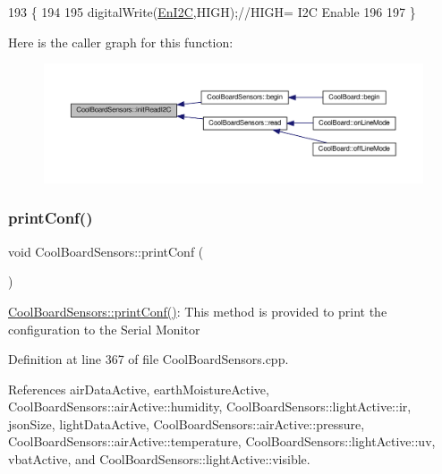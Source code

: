\begin{DoxyCode}
193 \{
194   
195     digitalWrite(\hyperlink{classCoolBoardSensors_aaa6b5dbf3a6633bffd9d204d961096dc}{EnI2C},HIGH);\textcolor{comment}{//HIGH= I2C Enable}
196 
197 \}
\end{DoxyCode}
Here is the caller graph for this function\+:
\nopagebreak
\begin{figure}[H]
\begin{center}
\leavevmode
\includegraphics[width=350pt]{classCoolBoardSensors_acad6a8418c66d36868caca23c844ecb6_icgraph}
\end{center}
\end{figure}
\mbox{\label{classCoolBoardSensors_af6fd79505815b204c178617ecf54c873}} 
\subsubsection{\texorpdfstring{print\+Conf()}{printConf()}}
{\footnotesize\ttfamily void Cool\+Board\+Sensors\+::print\+Conf (\begin{DoxyParamCaption}{ }\end{DoxyParamCaption})}

\hyperlink{classCoolBoardSensors_af6fd79505815b204c178617ecf54c873}{Cool\+Board\+Sensors\+::print\+Conf()}\+: This method is provided to print the configuration to the Serial Monitor 

Definition at line 367 of file Cool\+Board\+Sensors.\+cpp.



References air\+Data\+Active, earth\+Moisture\+Active, Cool\+Board\+Sensors\+::air\+Active\+::humidity, Cool\+Board\+Sensors\+::light\+Active\+::ir, json\+Size, light\+Data\+Active, Cool\+Board\+Sensors\+::air\+Active\+::pressure, Cool\+Board\+Sensors\+::air\+Active\+::temperature, Cool\+Board\+Sensors\+::light\+Active\+::uv, vbat\+Active, and Cool\+Board\+Sensors\+::light\+Active\+::visible.



